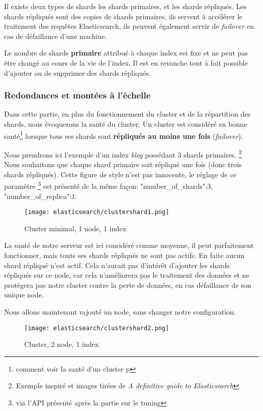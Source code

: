{Il existe deux types de shards les shards primaires, et les shards répliqués.
Les shards répliqués sont des copies de shards primaires, ils servent à accélérer
le traitement des requêtes Elasticsearch, ils peuvent également servir de \emph{failover} 
en cas de défaillance d'une machine.

Le nombre de shards \textbf{primaire} attribué à chaque index est fixe et ne peut 
pas être changé au cours de la vie de l'index. Il est en revanche tout à fait possible
d'ajouter ou de supprimer des shards répliqués.

\subsubsection{Redondances et montées à l'échelle}
Dans cette partie, en plus du fonctionnement du cluster et de la répartition des shards,
nous évoquerons la santé du cluster. Un cluster est considéré en bonne santé\footnote{comment 
voir la santé d'un cluster p\pageref{lst:elastichealth}} lorsque tous ses
shards sont \textbf{répliqués au moins une fois} (\textit{failover}).

Nous prendrons ici l'exemple d'un index \emph{blog} possédant 3 shards primaires. 
\footnote{Exemple inspiré et images tirées de \textit{A definitive guide to Elasticsearch}}
Nous souhaitons que chaque shard primaire soit répliqué une fois (donc trois shards
répliqués). Cette figure de style n'est pas innocente, le réglage de ce paramètre
\footnote{via l'API présenté après la partie sur le tuning} est présenté de la même
façon: "number\_of\_shards":3, "number\_of\_replica":1. 


\begin{figure}[H]
\center
\texttt{[image: elasticsearch/clustershard1.png]}
\label{fig:clustershard1}
\caption{Cluster minimal, 1 node, 1 index}
\end{figure}

La santé de notre serveur est ici considéré comme moyenne, il peut parfaitement 
fonctionner, mais touts ses shards répliqués ne sont pas  actifs. En faite aucun 
shard répliqué n'est actif. Cela n'aurait pas d'intérêt d'ajouter les shards répliqués
sur ce node, car cela n'améliorera pas le traitement des données et ne protégera pas
notre cluster contre la perte de données, en cas défaillance de son unique node.

Nous allons maintenant rajouté un node, sans changer notre configuration.

\begin{figure}[H]
\center
\texttt{[image: elasticsearch/clustershard2.png]}
\label{fig:clustershard2}
\caption{Cluster, 2 node, 1 index}
\end{figure}

}
